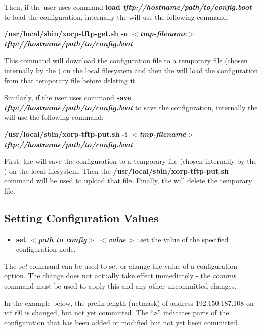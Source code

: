 Then, if the user uses \xorpsh command
\textbf{load \textit{tftp://hostname/path/to/config.boot}}
to load the configuration, internally the \rtrmgr will use the following
command:

\textbf{/usr/local/sbin/xorp-tftp-get.sh -o $<$\textit{tmp-filename}$>$
\textit{tftp://hostname/path/to/config.boot}}

This command will download the configuration file to a temporary file (chosen
internally by the \rtrmgr) on the local filesystem and then the \rtrmgr will
load the configuration from that temporary file before deleting it.

Similarly, if the user uses \xorpsh command
\textbf{save \textit{tftp://hostname/path/to/config.boot}}
to save the configuration, internally the \rtrmgr will use the following
command:

\textbf{/usr/local/sbin/xorp-tftp-put.sh -i $<$\textit{tmp-filename}$>$
\textit{tftp://hostname/path/to/config.boot}}

First, the \rtrmgr will save the configuration to a temporary file (chosen
internally by the \rtrmgr) on the local filesystem. Then the
\textbf{/usr/local/sbin/xorp-tftp-put.sh} command will be used to upload that
file. Finally, the \rtrmgr will delete the temporary file.

\newpage
\subsection{Setting Configuration Values}

\begin{itemize}
\item \textbf{set $<$\textit{path to config}$>$
$<$\textit{value}$>$}: set the value of the specified configuration
node.
\end{itemize}
The \emph{set} command can be used to set or change the value of a
configuration option.  The change does not actually take effect
immediately - the 
\emph{commit} command must be used to apply this and any other uncommitted
changes.

In the example below, the prefix length (netmask) of address
192.150.187.108 on vif rl0 is changed, but not yet committed.  The
``{\tt >}'' indicates parts of the configuration that has been added
or modified but not yet been committed.
\vspace{0.1in}

